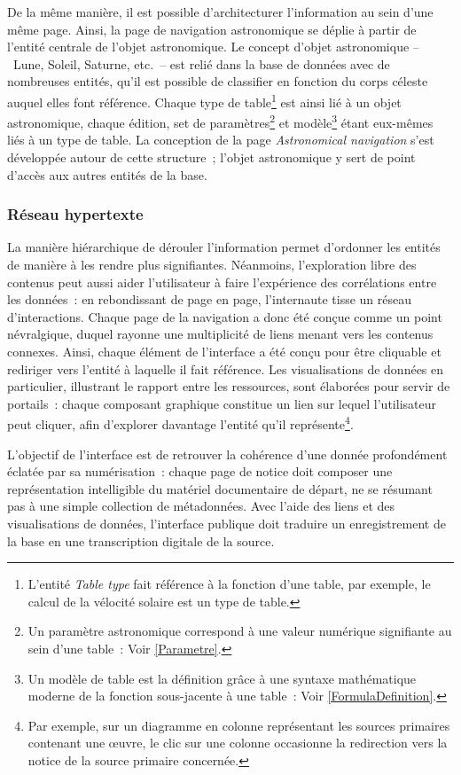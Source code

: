 \documentclass[a4paper,12pt,twoside]{book}
\newcommand{\eng}{\emph}
\newcommand{\bdd}{base de données\xspace}
\begin{document}
De la même manière, il est possible d'architecturer l'information au sein d'une même page. Ainsi, la page de navigation astronomique se déplie à partir de l'entité centrale de l'objet astronomique. Le concept d'objet astronomique –~Lune, Soleil, Saturne, etc.~– est relié dans la \bdd avec de nombreuses entités, qu'il est possible de classifier en fonction du corps céleste auquel elles font référence. Chaque type de table\footnote{L'entité \eng{Table type} fait référence à la fonction d'une table, par exemple, le calcul de la vélocité solaire est un type de table.} est ainsi lié à un objet astronomique, chaque édition, set de paramètres\footnote{Un paramètre astronomique correspond à une valeur numérique signifiante au sein d'une table~: Voir \ref{Parametre}.} et modèle\footnote{Un modèle de table est la définition grâce à une syntaxe mathématique moderne de la fonction sous-jacente à une table~: Voir \ref{FormulaDefinition}.} étant eux-mêmes liés à un type de table. La conception de la page \eng{Astronomical navigation} s'est développée autour de cette structure~; l'objet astronomique y sert de point d'accès aux autres entités de la base.

			\subsubsection{Réseau hypertexte\label{Reseau-hypertexte}}
La manière hiérarchique de dérouler l'information permet d'ordonner les entités de manière à les rendre plus signifiantes. Néanmoins, l'exploration libre des contenus peut aussi aider l'utilisateur à faire l'expérience des corrélations entre les données~: en rebondissant de page en page, l'internaute tisse un réseau d'interactions. Chaque page de la navigation a donc été conçue comme un point névralgique, duquel rayonne une multiplicité de liens menant vers les contenus connexes. Ainsi, chaque élément de l'interface a été conçu pour être cliquable et rediriger vers l'entité à laquelle il fait référence. Les visualisations de données en particulier, illustrant le rapport entre les ressources, sont élaborées pour servir de portails~: chaque composant graphique constitue un lien sur lequel l'utilisateur peut cliquer, afin d'explorer davantage l'entité qu'il représente\footnote{Par exemple, sur un diagramme en colonne représentant les sources primaires contenant une œuvre, le clic sur une colonne occasionne la redirection vers la notice de la source primaire concernée.}.

L'objectif de l'interface est de retrouver la cohérence d'une donnée profondément éclatée par sa numérisation~: chaque page de notice doit composer une représentation intelligible du matériel documentaire de départ, ne se résumant pas à une simple collection de métadonnées. Avec l'aide des liens et des visualisations de données, l'interface publique doit traduire un enregistrement de la base en une transcription digitale de la source.
\end{document}
